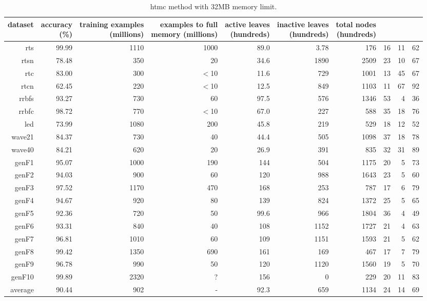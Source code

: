 \clearpage
\begin{table}
\caption{{\sc htmc} method with 32MB memory limit.}
\label{tab:htmc-32MB}
\centering
\begin{tabular}{|r|r|r|r|r|r|r|r|r|r|}
\hline
dataset	&
\rotatebox{90}{\parbox{9em}{accuracy\\(\%)}} &
\rotatebox{90}{\parbox{9em}{training examples\\(millions)}} &
\rotatebox{90}{\parbox{9em}{examples to full\\memory (millions)}} &
\rotatebox{90}{\parbox{9em}{active leaves\\(hundreds)}} &
\rotatebox{90}{\parbox{9em}{inactive leaves\\(hundreds)}} &
\rotatebox{90}{\parbox{9em}{total nodes\\(hundreds)}} &
\rotatebox{90}{\parbox{9em}{tree depth}}	&
\rotatebox{90}{\parbox{9em}{training speed (\%)}} &
\rotatebox{90}{\parbox{9em}{prediction speed (\%)}} \\
\hline
{\sc rts} & 99.99 & 1110 & 1000 & 89.0 & 3.78 & 176 & 16 & 11 & 62 \\
{\sc rtsn} & 78.48 & 350 & 20 & 34.6 & 1890 & 2509 & 23 & 10 & 67 \\
{\sc rtc} & 83.00 & 300 & $<$10 & 11.6 & 729 & 1001 & 13 & 45 & 67 \\
{\sc rtcn} & 62.45 & 220 & $<$10 & 12.5 & 849 & 1103 & 11 & 67 & 92 \\
{\sc rrbfs} & 93.27 & 730 & 60 & 97.5 & 576 & 1346 & 53 & 4 & 36 \\
{\sc rrbfc} & 98.72 & 770 & $<$10 & 67.0 & 227 & 588 & 35 & 18 & 76 \\
{\sc led} & 73.99 & 1080 & 200 & 45.8 & 219 & 529 & 18 & 12 & 52 \\
{\sc wave21} & 84.37 & 730 & 40 & 44.4 & 505 & 1098 & 37 & 18 & 78 \\
{\sc wave40} & 84.21 & 620 & 20 & 26.9 & 391 & 835 & 32 & 31 & 89 \\
{\sc genF1} & 95.07 & 1000 & 190 & 144 & 504 & 1175 & 20 & 5 & 73 \\
{\sc genF2} & 94.03 & 900 & 60 & 120 & 988 & 1643 & 23 & 5 & 60 \\
{\sc genF3} & 97.52 & 1170 & 470 & 168 & 253 & 787 & 17 & 6 & 79 \\
{\sc genF4} & 94.67 & 920 & 80 & 139 & 824 & 1372 & 25 & 5 & 65 \\
{\sc genF5} & 92.36 & 720 & 50 & 99.6 & 966 & 1804 & 36 & 4 & 49 \\
{\sc genF6} & 93.31 & 840 & 40 & 108 & 1152 & 1727 & 21 & 4 & 63 \\
{\sc genF7} & 96.81 & 1010 & 60 & 109 & 1151 & 1593 & 21 & 5 & 62 \\
{\sc genF8} & 99.42 & 1350 & 690 & 161 & 169 & 467 & 17 & 7 & 79 \\
{\sc genF9} & 96.78 & 990 & 50 & 120 & 1120 & 1560 & 19 & 5 & 70 \\
{\sc genF10} & 99.89 & 2320 & ? & 156 & 0 & 229 & 20 & 11 & 83 \\
\hline
average & 90.44 & 902 &  -  & 92.3 & 659 & 1134 & 24 & 14 & 69 \\
\hline
\end{tabular}
\end{table}
